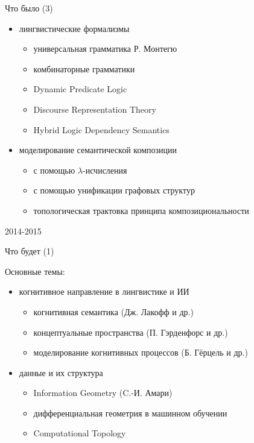 \documentclass{beamer}
\begin{document}
\begin{frame}{Что было (3)}
\begin{small}
\begin{itemize}
    \item лингвистические формализмы
    \begin{itemize}
        \item универсальная грамматика Р. Монтегю
        \item комбинаторные грамматики
        \item Dynamic Predicate Logic 
        \item Discourse Representation Theory
        \item Hybrid Logic Dependency Semantics
    \end{itemize}
    \item моделирование семантической композиции
    \begin{itemize}
        \item с помощью $\lambda$-исчисления
        \item с помощью унификации графовых структур
        \item топологическая трактовка принципа композициональности
    \end{itemize}
\end{itemize}
\end{small}
\end{frame}

\begin{frame}{}
\begin{center}
2014-2015
\end{center}
\end{frame}

\begin{frame}{Что будет (1)}
\begin{small}
Основные темы:\\
\medskip
\begin{itemize}
    \item когнитивное направление в лингвистике и ИИ
    \begin{itemize}
        \item когнитивная семантика (Дж. Лакофф и др.)
        \item концептуальные пространства (П. Гэрденфорс и др.)
        \item моделирование когнитивных процессов (Б. Гёрцель и др.)
    \end{itemize}
	\item данные и их структура
	\begin{itemize}
    	\item Information Geometry (C.-И. Амари)
    	\item дифференциальная геометрия в машинном обучении
    	\item Computational Topology
	\end{itemize}
\end{itemize}
\end{small}
\end{frame}
\end{document}
